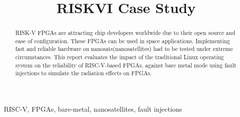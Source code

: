 \documentclass[conference]{IEEEtran}
\begin{document}
\title{RISKVI Case Study\\}
\author{
}
\maketitle

\begin{abstract}
RISK-V FPGAs are attracting chip developers worldwide due to their open source and 
ease of configuration. These FPGAs can be used in space applications. Implementing fast and reliable 
hardware on nanosats(nanosatellites) had to be tested under extreme circumstances. This report evaluates the
impact of the traditional Linux operating system on the reliability of RISC-V-based FPGAs, against bare metal mode 
using fault injections to simulate the radiation effects on FPGAs. 
\end{abstract}
\begin{IEEEkeywords}
RISC-V, FPGAs, bare-metal, nanosatellites, fault injections
\end{IEEEkeywords}

\end{document}
